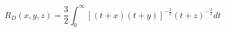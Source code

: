 \documentclass[12pt]{article}
\begin{document}
\begin{displaymath}
R_D(x, y, z) = \frac{3}{2} \int_{0}^{\infty} [(t+x)(t+y)]^{-\frac{1}{2}} (t+z)^{-\frac{3}{2}} dt
\end{displaymath}
\end{document}
